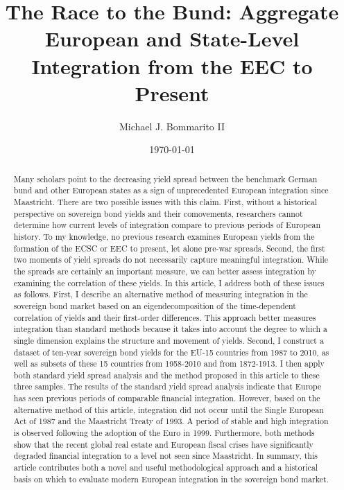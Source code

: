 \documentclass[3p]{elsarticle}
\begin{document}
\begin{frontmatter}

\title{The Race to the Bund: Aggregate European and State-Level Integration from the EEC to Present}

\author{Michael J. Bommarito II}
\address{Department of Political Science, University of Michigan, Ann Arbor}
\address{Department of Financial Engineering, University of Michigan, Ann Arbor}
\address{Center for the Study of Complex Systems, University of Michigan, Ann Arbor}
\date{\today}

\singlespacing

\begin{abstract}
Many scholars point to the decreasing yield spread between the benchmark German bund and other European states as a sign of unprecedented European integration since Maastricht.  There are two possible issues with this claim.  First, without a historical perspective on sovereign bond yields and their comovements, researchers cannot determine how current levels of integration compare to previous periods of European history.  To my knowledge, no previous research examines European yields from the formation of the ECSC or EEC to present, let alone pre-war spreads.  Second, the first two moments of yield spreads do not necessarily capture meaningful integration.  While the spreads are certainly an important measure, we can better assess integration by examining the correlation of these yields.  In this article, I address both of these issues as follows.  First, I describe an alternative method of measuring integration in the sovereign bond market based on an eigendecomposition of the time-dependent correlation of yields and their first-order differences.  This approach better measures integration than standard methods because it takes into account the degree to which a single dimension explains the structure and movement of yields.  Second, I construct a dataset of ten-year sovereign bond yields for the EU-15 countries from 1987 to 2010, as well as subsets of these 15 countries from 1958-2010 and from 1872-1913.  I then apply both standard yield spread analysis and the method proposed in this article to these three samples.  The results of the standard yield spread analysis indicate that Europe has seen previous periods of comparable financial integration.  However, based on the alternative method of this article, integration did not occur until the Single European Act of 1987 and the Maastricht Treaty of 1993.  A period of stable and high integration is observed following the adoption of the Euro in 1999.  Furthermore, both methods show that the recent global real estate and European fiscal crises have significantly degraded financial integration to a level not seen since Maastricht.  In summary, this article contributes both a novel and useful methodological approach and a historical basis on which to evaluate modern European integration in the sovereign bond market.
\end{abstract}


\end{frontmatter}
\end{document}
